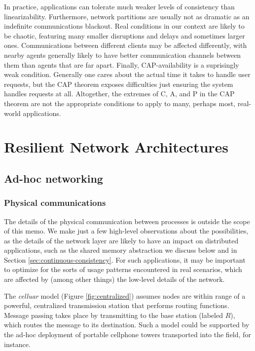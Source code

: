 \documentclass[]             %
{NASA}                       %
\theoremstyle{definition}
\begin{document}
In practice, applications can tolerate much weaker levels of consistency
than linearizability. Furthermore, network partitions are usually not as
dramatic as an indefinite communications blackout. Real conditions in
our context are likely to be chaotic, featuring many smaller disruptions
and delays and sometimes larger ones. Communications between different
clients may be affected differently, with nearby agents generally likely
to have better communication channels between them than agents that are
far apart. Finally, CAP-availability is a suprisingly weak condition.
Generally one cares about the actual time it takes to handle user
requests, but the CAP theorem exposes difficulties just ensuring the
system handles requests at all. Altogether, the extremes of C, A, and P
in the CAP theorem are not the appropriate conditions to apply to many,
perhaps most, real-world applications.

\section{Resilient Network Architectures}
\label{sec:networking}

\subsection{Ad-hoc networking}
\label{ad-hoc-networking}

\subsubsection{Physical communications}
\label{physical-communications}

The details of the physical communication between processes is outside
the scope of this memo. We make just a few high-level observations about
the possibilities, as the details of the network layer are likely to
have an impact on distributed applications, such as the shared memory
abstraction we discuss below and in Section
\ref{sec:continuous-consistency}. For such applications, it may be
important to optimize for the sorts of usage patterns encountered in
real scenarios, which are affected by (among other things) the low-level
details of the network.

The \emph{celluar} model (Figure \ref{fig:centralized}) assumes nodes
are within range of a powerful, centralized transmission station that
performs routing functions. Message passing takes place by transmitting
to the base station (labeled \(R\)), which routes the message to its
destination. Such a model could be supported by the ad-hoc deployment of
portable cellphone towers transported into the field, for instance.
\end{document}
